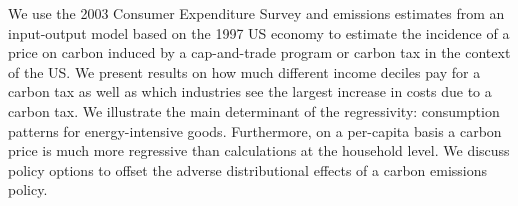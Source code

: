 We use the 2003 Consumer Expenditure Survey and emissions estimates from an input-output model based on the 1997 US economy to estimate the incidence of a price on carbon induced by a cap-and-trade program or carbon tax in the context of the US. We present results on how much different income deciles pay for a carbon tax as well as which industries see the largest increase in costs due to a carbon tax. We illustrate the main determinant of the regressivity: consumption patterns for energy-intensive goods. Furthermore, on a per-capita basis a carbon price is much more regressive than calculations at the household level. We discuss policy options to offset the adverse distributional effects of a carbon emissions policy.